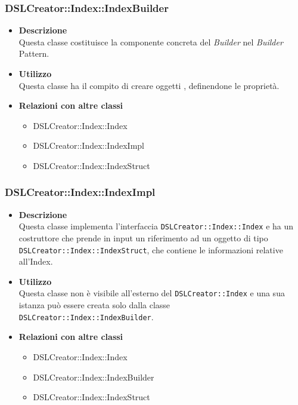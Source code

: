  \subsubsection{DSLCreator::Index::IndexBuilder}
                    \begin{itemize}
                        \item \textbf{Descrizione} \hfill \\
                            Questa classe costituisce la componente concreta del \textit{Builder} nel \textit{Builder} Pattern.
                        \item \textbf{Utilizzo} \hfill \\
                            Questa classe ha il compito di creare oggetti , definendone le proprietà.
                        \item \textbf{Relazioni con altre classi}
                            \begin{itemize}
                              \item DSLCreator::Index::Index
                              \item DSLCreator::Index::IndexImpl
                              \item DSLCreator::Index::IndexStruct
                            \end{itemize}
                    \end{itemize}
  
 \subsubsection{DSLCreator::Index::IndexImpl}
                    \begin{itemize}
                        \item \textbf{Descrizione} \hfill \\
                          Questa classe implementa l'interfaccia \texttt{DSLCreator::Index::Index} e ha un costruttore che prende in input un riferimento ad un oggetto di tipo \texttt{DSLCrea\-tor::Index::IndexStruct}, che contiene le informazioni relative all'Index.
                        \item \textbf{Utilizzo} \hfill \\
                          Questa classe non è visibile all'esterno del  \texttt{DSLCreator::Index} e una sua istanza può essere creata solo dalla classe \texttt{DSLCreator::Index::IndexBuilder}.
                        \item \textbf{Relazioni con altre classi}
                            \begin{itemize}
                              \item DSLCreator::Index::Index
                              \item DSLCreator::Index::IndexBuilder
                              \item DSLCreator::Index::IndexStruct
                            \end{itemize}
                    \end{itemize}

